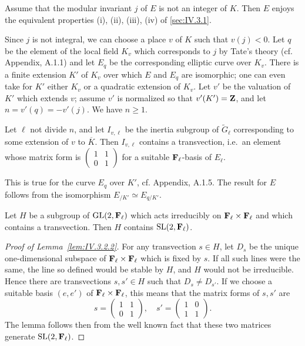 
\begin{theorem}
Assume that the modular invariant $j$ of $E$ is not an integer of $K$. Then $E$ enjoys the equivalent properties (i), (ii), (iii), (iv) of \ref{sec:IV.3.1}.
\end{theorem}

Since $j$ is not integral, we can choose a place $v$ of $K$ such that $v(j) < 0$. Let $q$ be the element of the local field $K_v$ which corresponds to $j$ by Tate's theory (cf. Appendix, A.1.1) and let $E_q$ be the corresponding elliptic curve over $K_v$. There is a finite extension $K'$ of $K_v$ over which $E$ and $E_q$ are isomorphic; one can even take for $K'$ either $K_v$ or a quadratic extension of $K_v$. Let $v'$ be the valuation of $K'$ which extends $v$; assume $v'$ is normalized so that $v'(K') = \mathbf{Z}$, and let $n = v'(q) = -v'(j)$. We have $n \geq 1$.

\begin{lemma}[1]\label{lem:IV.3.2.1}
Let $\ell$ not divide $n$, and let $I_{v,\ell}$ be the inertia subgroup of $\widetilde{G}_\ell$ corresponding to some extension of $v$ to $\overline{K}$. Then $I_{v,\ell}$ contains a transvection, i.e.\ an element whose matrix form is $\begin{pmatrix} 1 & 1 \\ 0 & 1 \end{pmatrix}$ for a suitable $\mathbf{F}_\ell$-basis of $E_\ell$.
\end{lemma}

This is true for the curve $E_q$ over $K'$, cf. Appendix, A.1.5. The result for $E$ follows from the isomorphism $E_{/K'} \simeq E_{q/K'}$.

\begin{lemma}[2]\label{lem:IV.3.2.2}
Let $H$ be a subgroup of $\mathrm{GL}(2,\mathbf{F}_\ell)$ which acts irreducibly on $\mathbf{F}_\ell \times \mathbf{F}_\ell$ and which contains a transvection. Then $H$ contains $\mathrm{SL}(2,\mathbf{F}_\ell)$.
\end{lemma}

\begin{proof}[Proof of Lemma~\ref{lem:IV.3.2.2}]
For any transvection $s \in H$, let $D_s$ be the unique one-dimensional subspace of $\mathbf{F}_\ell \times \mathbf{F}_\ell$ which is fixed by $s$. If all such lines were the same, the line so defined would be stable by $H$, and $H$ would not be irreducible. Hence there are transvections $s,s' \in H$ such that $D_s \neq D_{s'}$. If we choose a suitable basis $(e,e')$ of $\mathbf{F}_\ell \times \mathbf{F}_\ell$, this means that the matrix forms of $s,s'$ are
\[
  s = \begin{pmatrix} 1 & 1 \\ 0 & 1 \end{pmatrix}, \quad
  s' = \begin{pmatrix} 1 & 0 \\ 1 & 1 \end{pmatrix}.
\]
The lemma follows then from the well known fact that these two matrices generate $\mathrm{SL}(2,\mathbf{F}_\ell)$.
\end{proof}

